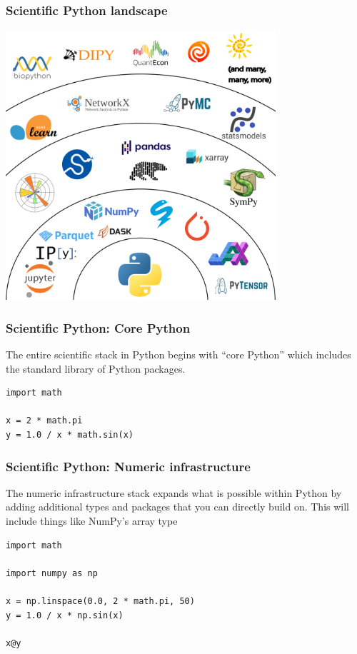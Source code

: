 \documentclass[
    xcolor={svgnames,dvipsnames},
    hyperref={colorlinks, citecolor=DeepPink4, linkcolor=DarkRed, urlcolor=DarkBlue}
]{beamer}  %
\newcommand{\1}{\mathbbm 1}
\begin{document}
\begin{frame}
    \frametitle{Scientific Python landscape}

    \begin{center}
        \includegraphics[width=0.75\textwidth]{python_landscape.png}
    \end{center}

\end{frame}

\begin{frame}[fragile]
    \frametitle{Scientific Python: Core Python}

    The entire scientific stack in Python begins with ``core Python'' which includes the standard
    library of Python packages.

    \begin{verbatim}
import math

x = 2 * math.pi
y = 1.0 / x * math.sin(x)
    \end{verbatim}

\end{frame}

\begin{frame}[fragile]
    \frametitle{Scientific Python: Numeric infrastructure}

    The numeric infrastructure stack expands what is possible within Python by adding additional
    types and packages that you can directly build on. This will include things like NumPy's
    array type

    \begin{verbatim}
import math

import numpy as np

x = np.linspace(0.0, 2 * math.pi, 50)
y = 1.0 / x * np.sin(x)

x@y
    \end{verbatim}

\end{frame}
\end{document}

